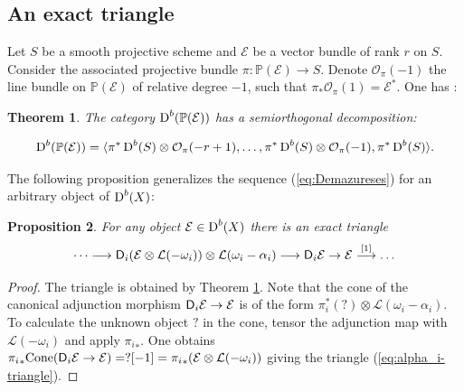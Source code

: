 \documentclass[sn-mathphys-num]{sn-jnl}%
\newcommand{\Oo}{\mathcal O}
\newcommand{\Ee}{\mathcal E}
\newcommand{\Ll}{\mathcal L}
\newcommand*{\Dd}{\mathop{\mathrm D\kern0pt}\nolimits}
\newcommand{\sd}{\sf D}
\newcommand{\Pp}{\mathbb P}
\newtheorem{theorem}{Theorem}[section]
\newtheorem{proposition}[theorem]{Proposition}
\theoremstyle{definition}
\begin{document}
\subsection{An exact triangle}
Let $S$ be a smooth projective scheme and $\Ee$ be a vector bundle of rank $r$ on $S$. Consider the associated projective bundle $\pi :   \Pp (\Ee)\rightarrow S$. Denote $\Oo _{\pi}(-1)$ the line bundle on $  \Pp (\Ee)$ of relative degree $-1$, such that $\pi _{\ast}\Oo _{\pi}(1)=\Ee ^{\ast}$. 
One has \cite[Corollary 8.36]{Huyb}:

\begin{theorem}\label{th:Orlovth}
The category $\Dd ^b(  \Pp (\Ee))$ has a semiorthogonal decomposition: 

\begin{equation}
\Dd ^b(  \Pp (\Ee)) = \langle \pi ^{\ast}\Dd ^b(S)\otimes \Oo _{\pi}(-r+1),\dots ,  \pi ^{\ast}\Dd ^b(S)\otimes \Oo _{\pi}(-1),\pi ^{\ast}\Dd ^b(S)\rangle .
\end{equation}

\end{theorem}

The following proposition generalizes the sequence (\ref{eq:Demazureses}) for an arbitrary object of $\Dd ^b(X)$:

\begin{proposition}\label{prop:alpha_i-triangle}
For any object $\Ee \in \Dd ^b(X)$ there is an exact triangle 
\begin{equation}\label{eq:alpha_i-triangle}
\dots \longrightarrow {\sd }_i(\Ee \otimes \Ll (-\omega _i))\otimes \Ll (\omega _i-\alpha_i)\longrightarrow {\sd }_i\Ee \rightarrow \Ee \stackrel{[1]}\longrightarrow \dots 
\end{equation}
\end{proposition}

\begin{proof}
The triangle is obtained by Theorem \ref{th:Orlovth}. Note that the cone 
of the canonical adjunction morphism ${\sd }_i\Ee \rightarrow \Ee$ is of the form $\pi _i^{\ast}(?)\otimes \Ll (\omega _i-\alpha_i)$. To calculate the unknown object $?$ in the cone, tensor the adjunction map with $\Ll (-\omega _i)$ and apply ${\pi _i}_{\ast}$. One obtains ${\pi _i}_{\ast}{\rm Cone}({\sd }_i\Ee \rightarrow \Ee)=?[-1]={\pi _i}_{\ast}(\Ee\otimes \Ll (-\omega _i))$ giving the triangle (\ref{eq:alpha_i-triangle}).
\end{proof}
\end{document}

